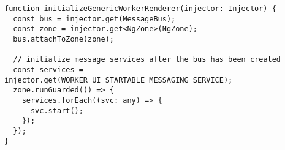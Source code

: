 \begin{verbatim}
function initializeGenericWorkerRenderer(injector: Injector) {
  const bus = injector.get(MessageBus);
  const zone = injector.get<NgZone>(NgZone);
  bus.attachToZone(zone);

  // initialize message services after the bus has been created
  const services = injector.get(WORKER_UI_STARTABLE_MESSAGING_SERVICE);
  zone.runGuarded(() => {
    services.forEach((svc: any) => {
      svc.start();
    });
  });
}
\end{verbatim}
